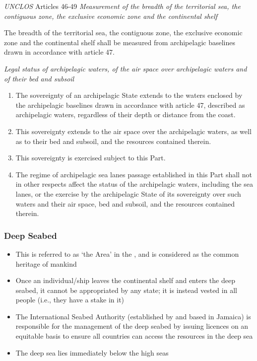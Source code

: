 \begin{conventiondetails}{\textit{UNCLOS} Articles 46-49}
    \textit{Measurement of the breadth of the territorial sea, the contiguous zone,
    the exclusive economic zone and the continental shelf}

    \vspace{\baselineskip}

    The breadth of the territorial sea, the contiguous zone, the exclusive economic zone and the continental shelf shall be measured from archipelagic baselines drawn in accordance with article 47.

    \textit{Legal status of archipelagic waters, of the air space over archipelagic waters and of their bed and subsoil}
    \begin{enumerate}
        \item The sovereignty of an archipelagic State extends to the waters enclosed by the archipelagic baselines drawn in accordance with article 47, described as archipelagic waters, regardless of their depth or distance from the coast.
        \item This sovereignty extends to the air space over the archipelagic waters, as well as to their bed and subsoil, and the resources contained therein.
        \item This sovereignty is exercised subject to this Part.
        \item The regime of archipelagic sea lanes passage established in this Part shall not in other respects affect the status of the archipelagic waters, including the sea lanes, or the exercise by the archipelagic State of its sovereignty over such waters and their air space, bed and subsoil, and the resources contained therein.
    \end{enumerate}

\end{conventiondetails}

\subsubsection{Deep Seabed}
\begin{itemize}
    \item This is referred to as `the Area' in the , and is considered as the common heritage of mankind
    \item Once an individual/ship leaves the continental shelf and enters the deep seabed, it cannot be appropriated by any state; it is instead vested in all people (i.e., they have a stake in it)
    \item The International Seabed Authority (established by  and based in Jamaica) is responsible for the management of the deep seabed by issuing licences on an equitable basis to ensure all countries can access the resources in the deep sea
    \item The deep sea lies immediately below the high seas
\end{itemize}


